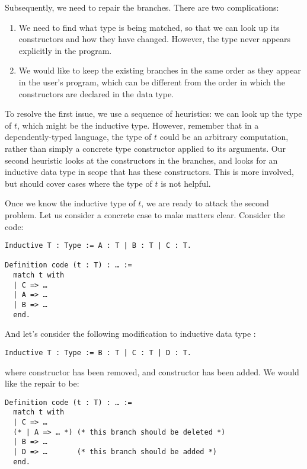 Subsequently, we need to repair the branches.  There are two complications:

\begin{enumerate}

  \item We need to find what type is being matched, so that we can look up its
constructors and how they have changed.  However, the type never appears
explicitly in the program.

  \item We would like to keep the existing branches in the same order as they
appear in the user's program, which can be different from the order in which the
constructors are declared in the data type.

\end{enumerate}

To resolve the first issue, we use a sequence of heuristics: we can look up the
type of $t$, which might be the inductive type.  However, remember that in a
dependently-typed language, the type of $t$ could be an arbitrary computation,
rather than simply a concrete type constructor applied to its arguments.  Our
second heuristic looks at the constructors in the branches, and looks for an
inductive data type in scope that has these constructors.  This is more involved,
but should cover cases where the type of $t$ is not helpful.

Once we know the inductive type of $t$, we are ready to attack the second
problem.  Let us consider a concrete case to make matters clear.  Consider the
code:

\begin{verbatim}
Inductive T : Type := A : T | B : T | C : T.

Definition code (t : T) : … :=
  match t with
  | C => …
  | A => …
  | B => …
  end.
\end{verbatim}

\noindent%
%
And let's consider the following modification to inductive data type
:

\begin{verbatim}
Inductive T : Type := B : T | C : T | D : T.
\end{verbatim}

\noindent%
%
where constructor  has been removed, and constructor 
has been added.  We would like the repair to be:

\begin{verbatim}
Definition code (t : T) : … :=
  match t with
  | C => …
  (* | A => … *) (* this branch should be deleted *)
  | B => …
  | D => …       (* this branch should be added *)
  end.
\end{verbatim}

